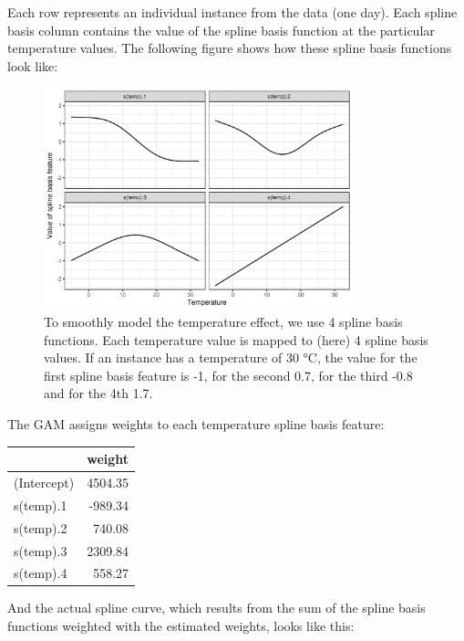 \documentclass[
  11pt,
]{scrbook}
\begin{document}
Each row represents an individual instance from the data (one day).
Each spline basis column contains the value of the spline basis function at the particular temperature values.
The following figure shows how these spline basis functions look like:

\begin{figure}

{\centering \includegraphics[width=0.8\textwidth]{images/splines-1} 

}

\caption{To smoothly model the temperature effect, we use 4 spline basis functions. Each temperature value is mapped to (here) 4 spline basis values. If an instance has a temperature of 30 °C, the value for the first spline basis feature is -1, for the second 0.7, for the third -0.8 and for the 4th 1.7.}\label{fig:splines}
\end{figure}

The GAM assigns weights to each temperature spline basis feature:

\begin{table}
\centering
\begin{tabular}{lr}
\toprule
  & weight\\
\midrule
(Intercept) & 4504.35\\
s(temp).1 & -989.34\\
s(temp).2 & 740.08\\
s(temp).3 & 2309.84\\
s(temp).4 & 558.27\\
\bottomrule
\end{tabular}
\end{table}

And the actual spline curve, which results from the sum of the spline basis functions weighted with the estimated weights, looks like this:
\end{document}
